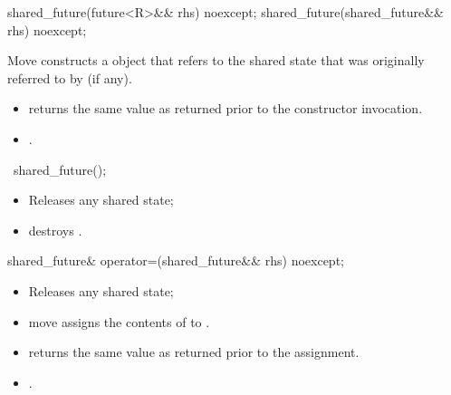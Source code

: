 %
\begin{itemdecl}
shared_future(future<R>&& rhs) noexcept;
shared_future(shared_future&& rhs) noexcept;
\end{itemdecl}

\begin{itemdescr}
\pnum
\effects
Move constructs a  object that refers to the
shared state that was originally referred to by  (if any).

\pnum
\ensures
\begin{itemize}
\item {} returns the same value as  returned prior to
the constructor invocation.
\item {}.
\end{itemize}
\end{itemdescr}

%
\begin{itemdecl}
~shared_future();
\end{itemdecl}

\begin{itemdescr}
\pnum
\effects
\begin{itemize}
\item
Releases any shared state;
\item
destroys .
\end{itemize}
\end{itemdescr}

%
\begin{itemdecl}
shared_future& operator=(shared_future&& rhs) noexcept;
\end{itemdecl}

\begin{itemdescr}
\pnum
\effects
\begin{itemize}
\item
Releases any shared state;
\item
move assigns the contents of  to .
\end{itemize}

\pnum
\ensures
\begin{itemize}
\item
{} returns the same value as  returned prior to
the assignment.

\item
{}.
\end{itemize}
\end{itemdescr}

